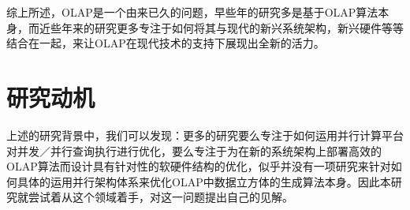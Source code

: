 综上所述，OLAP是一个由来已久的问题，早些年的研究多是基于OLAP算法本身，而近些年来的研究更多专注于如何将其与现代的新兴系统架构，新兴硬件等等结合在一起，来让OLAP在现代技术的支持下展现出全新的活力。


\section{研究动机}
上述的研究背景中，我们可以发现：更多的研究要么专注于如何运用并行计算平台对并发／并行查询执行进行优化，要么专注于为在新的系统架构上部署高效的OLAP算法而设计具有针对性的软硬件结构的优化，似乎并没有一项研究来针对如何具体的运用并行架构体系来优化OLAP中数据立方体的生成算法本身。因此本研究就尝试着从这个领域着手，对这一问题提出自己的见解。
